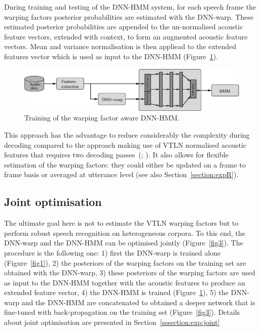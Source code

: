 \documentclass{nle}
\begin{document}

During training  and testing  of the DNN-HMM  system, for  each speech
frame the  warping factors posterior probabilities are  estimated with
the DNN-warp. These estimated  posterior probabilities are appended to
the un-normalised acoustic feature vectors, extended  with context, to
form an augmented acoustic feature vectors. Mean and variance normalisation is then appliead to the extended features vector
which is used as input to the DNN-HMM (Figure~\ref{fig2}).
 \begin{figure}
       \includegraphics[width=\textwidth]{fig2}
         \caption{Training of the warping factor aware DNN-HMM.} 
    	\label{fig2}
 \end{figure}
 
This approach has the  advantage to reduce considerably the complexity
during decoding compared to the approach making use of VTLN normalised
acoustic features that requires two decoding passes~(\citealp{LeeRos96}; \citealp*{WelKanNey99}). It also allows for flexible estimation of the warping factors: they could either be updated on a frame to frame basis or averaged at utterance level (see also Section~\ref{section:expR}).

\subsection{Joint optimisation}
The ultimate goal here is not to estimate the VTLN warping factors but to perform robust speech recognition on heterogeneous corpora. To this end, the DNN-warp and the DNN-HMM can be optimised jointly (Figure~\ref{fig3}). The procedure is the following one: 1) first the DNN-warp is trained alone (Figure~\ref{fig1}), 2) the posteriors of the warping factors on the training set are obtained with the DNN-warp, 3) these posteriors of the warping factors are used as input to the DNN-HMM together with the acoustic features to produce an extended feature vector, 4) the DNN-HMM is trained (Figure~\ref{fig2}), 5)  the DNN-warp and the DNN-HMM are concatenated to obtained a deeper network that is fine-tuned with back-propagation on the training set (Figure~\ref{fig3}). Details about joint optimisation are presented in Section~\ref{sssection:exp:joint}
\end{document}
